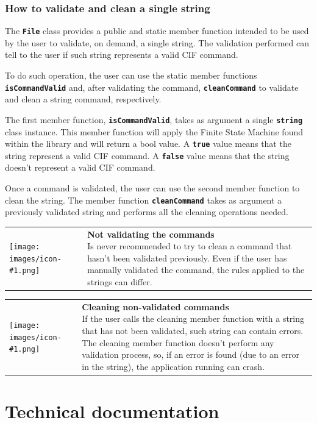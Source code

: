 \documentclass[11pt,twoside,openany,x11names,svgnames]{memoir}
\makeatletter
\newcommand\chapterillustration{}
\newcommand{\IconNote}[3]
{
	\begin{table}[ht]
	\begin{tabular}{ lm{\dimexpr\textwidth-8\tabcolsep-\wd0}@{}}
		\toprule
		\texttt{[image: images/icon-\#1.png]}
		&
		\parbox[t]{155mm}{
		\textbf{#2} \\
		#3
		}
	\end{tabular}
\end{table}
}
\makeatother
\begin{document}
\subsection{How to validate and clean a single string}

The \textbf{\texttt{File}} class provides a public and static member function intended to be used by the user to validate, on demand, a single string. The validation performed can tell to the user if such string represents a valid CIF command.

To do such operation, the user can use the static member functions \textbf{\texttt{isCommandValid}} and, after validating the command, \textbf{\texttt{cleanCommand}} to validate and clean a string command, respectively.

The first member function, \textbf{\texttt{isCommandValid}}, takes as argument a single \textbf{\texttt{string}} class instance. This member function will apply the Finite State Machine found within the library and will return a bool value. A \textbf{\texttt{true}} value means that the string represent a valid CIF command. A \textbf{\texttt{false}} value means that the string doesn't represent a valid CIF command.

Once a command is validated, the user can use the second member function to clean the string. The member function \textbf{\texttt{cleanCommand}} takes as argument a previously validated string and performs all the cleaning operations needed.

\IconNote
	{warning}
	{Not validating the commands}
	{Is never recommended to try to clean a command that hasn't been validated previously. Even if the user has manually validated the command, the rules applied to the strings can differ.}
	
\IconNote
	{error}
	{Cleaning non-validated commands}
	{If the user calls the cleaning member function with a string that has not been validated, such string can contain errors. The cleaning member function doesn't perform any validation process, so, if an error is found (due to an error in the string), the application running can crash.}

\renewcommand\chapterillustration{images/chapter03-cover}
\chapter{Technical documentation}\label{Technical-documentation}
\end{document}
